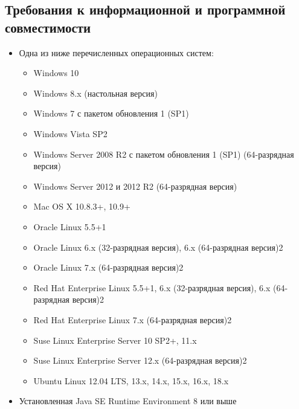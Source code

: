 \documentclass{../TechDoc}
\begin{document}
	\subsection{Требования к информационной и программной совместимости}
	\begin{itemize}
		\item Одна из ниже перечисленных операционных систем\cite{javareq}:
		\begin{itemize}
			\item Windows 10
			\item Windows 8.x (настольная версия)
			\item Windows 7 с пакетом обновления 1 (SP1)
			\item Windows Vista SP2
			\item Windows Server 2008 R2 с пакетом обновления 1 (SP1) (64-разрядная версия)
			\item Windows Server 2012 и 2012 R2 (64-разрядная версия)
			\item Mac OS X 10.8.3+, 10.9+
			\item Oracle Linux 5.5+1
			\item Oracle Linux 6.x (32-разрядная версия), 6.x (64-разрядная версия)2
			\item Oracle Linux 7.x (64-разрядная версия)2
			\item Red Hat Enterprise Linux 5.5+1, 6.x (32-разрядная версия), 6.x (64-разрядная версия)2
			\item Red Hat Enterprise Linux 7.x (64-разрядная версия)2
			\item Suse Linux Enterprise Server 10 SP2+, 11.x
			\item Suse Linux Enterprise Server 12.x (64-разрядная версия)2
			\item Ubuntu Linux 12.04 LTS, 13.x, 14.x, 15.x, 16.x, 18.x
		\end{itemize}
		\item Установленная Java SE Runtime Environment 8\cite{Java} или выше
	\end{itemize}
\end{document}
